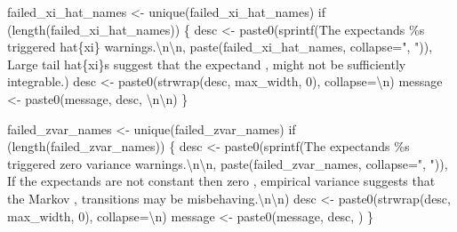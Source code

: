\documentclass[
  letterpaper,
  DIV=11,
  numbers=noendperiod]{scrartcl}
\newenvironment{Shaded}{\begin{snugshade}}{\end{snugshade}}
\newcommand{\CharTok}[1]{\textcolor[rgb]{0.13,0.47,0.30}{#1}}
\newcommand{\ControlFlowTok}[1]{\textcolor[rgb]{0.00,0.23,0.31}{#1}}
\newcommand{\DecValTok}[1]{\textcolor[rgb]{0.68,0.00,0.00}{#1}}
\newcommand{\NormalTok}[1]{\textcolor[rgb]{0.00,0.23,0.31}{#1}}
\newcommand{\OperatorTok}[1]{\textcolor[rgb]{0.37,0.37,0.37}{#1}}
\newcommand{\SpecialCharTok}[1]{\textcolor[rgb]{0.37,0.37,0.37}{#1}}
\newcommand{\StringTok}[1]{\textcolor[rgb]{0.13,0.47,0.30}{#1}}
\begin{document}
\begin{Shaded}
\begin{Highlighting}[]
\NormalTok{  failed\_xi\_hat\_names }\OperatorTok{\textless{}{-}}\NormalTok{ unique(failed\_xi\_hat\_names)}
  \ControlFlowTok{if}\NormalTok{ (length(failed\_xi\_hat\_names)) \{}
\NormalTok{    desc }\OperatorTok{\textless{}{-}} 
\NormalTok{      paste0(sprintf(}\StringTok{\textquotesingle{}The expectands }\SpecialCharTok{\%s}\StringTok{ triggered hat}\SpecialCharTok{\{xi\}}\StringTok{ warnings.}\CharTok{\textbackslash{}n\textbackslash{}n}\StringTok{\textquotesingle{}}\NormalTok{,}
\NormalTok{             paste(failed\_xi\_hat\_names, collapse}\OperatorTok{=}\StringTok{", "}\NormalTok{)),}
             \StringTok{\textquotesingle{}  Large tail hat}\SpecialCharTok{\{xi\}}\StringTok{s suggest that the expectand \textquotesingle{}}\NormalTok{,}
             \StringTok{\textquotesingle{}might not be sufficiently integrable.\textquotesingle{}}\NormalTok{)}
\NormalTok{    desc }\OperatorTok{\textless{}{-}}\NormalTok{ paste0(strwrap(desc, max\_width, }\DecValTok{0}\NormalTok{), collapse}\OperatorTok{=}\StringTok{\textquotesingle{}}\CharTok{\textbackslash{}n}\StringTok{\textquotesingle{}}\NormalTok{)}
\NormalTok{    message }\OperatorTok{\textless{}{-}}\NormalTok{ paste0(message, desc, }\StringTok{\textquotesingle{}}\CharTok{\textbackslash{}n\textbackslash{}n}\StringTok{\textquotesingle{}}\NormalTok{)}
\NormalTok{  \}}
        
\NormalTok{  failed\_zvar\_names }\OperatorTok{\textless{}{-}}\NormalTok{ unique(failed\_zvar\_names)}
  \ControlFlowTok{if}\NormalTok{ (length(failed\_zvar\_names)) \{ }
\NormalTok{    desc }\OperatorTok{\textless{}{-}} 
\NormalTok{      paste0(sprintf(}\StringTok{\textquotesingle{}The expectands }\SpecialCharTok{\%s}\StringTok{ triggered zero variance warnings.}\CharTok{\textbackslash{}n\textbackslash{}n}\StringTok{\textquotesingle{}}\NormalTok{,}
\NormalTok{             paste(failed\_zvar\_names, collapse}\OperatorTok{=}\StringTok{", "}\NormalTok{)),}
             \StringTok{\textquotesingle{}  If the expectands are not constant then zero \textquotesingle{}}\NormalTok{,}
             \StringTok{\textquotesingle{}empirical variance suggests that the Markov \textquotesingle{}}\NormalTok{,}
             \StringTok{\textquotesingle{}transitions may be misbehaving.}\CharTok{\textbackslash{}n\textbackslash{}n}\StringTok{\textquotesingle{}}\NormalTok{)}
\NormalTok{    desc }\OperatorTok{\textless{}{-}}\NormalTok{ paste0(strwrap(desc, max\_width, }\DecValTok{0}\NormalTok{), collapse}\OperatorTok{=}\StringTok{\textquotesingle{}}\CharTok{\textbackslash{}n}\StringTok{\textquotesingle{}}\NormalTok{)}
\NormalTok{    message }\OperatorTok{\textless{}{-}}\NormalTok{ paste0(message, desc, }\StringTok{\textquotesingle{}\textquotesingle{}}\NormalTok{)}
\NormalTok{  \}}
  

\end{Highlighting}
\end{Shaded}
\end{document}
